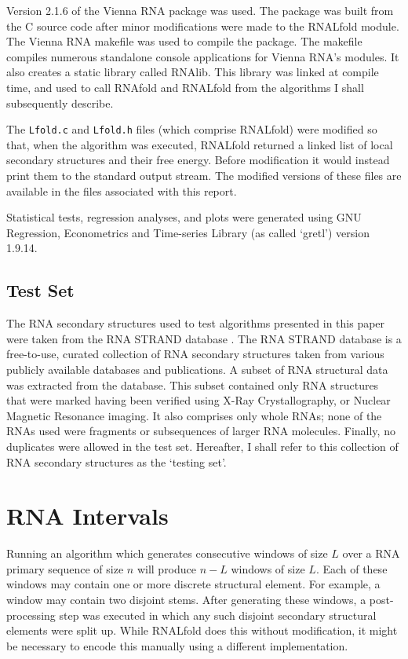 \documentclass{cshonours}
\begin{document}
Version 2.1.6 of the Vienna RNA package was used. The package was built from the C source code after minor modifications were made to the RNALfold module. The Vienna RNA makefile was used to compile the package. The makefile compiles numerous standalone console applications for Vienna RNA's modules. It also creates a static library called RNAlib. This library was linked at compile time, and used to call RNAfold and RNALfold from the algorithms I shall subsequently describe.

The \texttt{Lfold.c} and \texttt{Lfold.h} files (which comprise RNALfold) were modified so that, when the algorithm was executed, RNALfold returned a linked list of local secondary structures and their free energy. Before modification it would instead print them to the standard output stream. The modified versions of these files are available in the files associated with this report.

Statistical tests, regression analyses, and plots were generated using GNU Regression, Econometrics and Time-series Library (as called `gretl') version 1.9.14.


\subsection{Test Set}
The RNA secondary structures used to test algorithms presented in this paper were taken from the RNA STRAND database \cite{andronescu2008rna}. The RNA STRAND database is a free-to-use, curated collection of RNA secondary structures taken from various publicly available databases and publications. A subset of RNA structural data was extracted from the database. This subset contained only RNA structures that were marked having been verified using X-Ray Crystallography, or Nuclear Magnetic Resonance imaging. It also comprises only whole RNAs; none of the RNAs used were fragments or subsequences of larger RNA molecules. Finally, no duplicates were allowed in the test set. Hereafter, I shall refer to this collection of RNA secondary structures as the `testing set'.


\section{RNA Intervals}
Running an algorithm which generates consecutive windows of size $L$ over a RNA primary sequence of size $n$ will produce $n-L$ windows of size $L$. Each of these windows may contain one or more discrete structural element. For example, a window may contain two disjoint stems. After generating these windows, a post-processing step was executed in which any such disjoint secondary structural elements were split up. While RNALfold does this without modification, it might be necessary to encode this manually using a different implementation.
\end{document}
